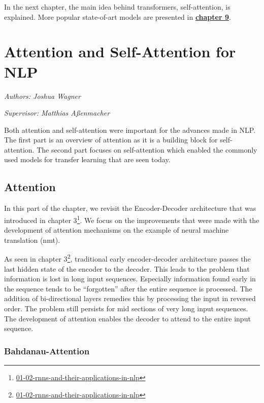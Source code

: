 \documentclass[]{krantz}
\renewcommand{\href}[2]{#2\footnote{\url{#1}}}
\begin{document}
In the next chapter, the main idea behind transformers, self-attention, is explained. More popular state-of-art models are presented in \protect\hyperlink{transfer-learning-for-nlp-ii}{\textbf{chapter 9}}.

\hypertarget{attention-and-self-attention-for-nlp}{%
\chapter{Attention and Self-Attention for NLP}\label{attention-and-self-attention-for-nlp}}

\emph{Authors: Joshua Wagner}

\emph{Supervisor: Matthias Aßenmacher}

Both attention and self-attention were important for the advances made in NLP.
The first part is an overview of attention as it is a building block for self-attention.
The second part focuses on self-attention which enabled the commonly used models
for transfer learning that are seen today.

\hypertarget{attention}{%
\section{Attention}\label{attention}}

In this part of the chapter, we revisit the Encoder-Decoder architecture that was introduced
in chapter \href{01-02-rnns-and-their-applications-in-nlp}{3}. We focus on the improvements
that were made with the development of attention mechanisms on the example of neural machine translation (nmt).

As seen in chapter \href{01-02-rnns-and-their-applications-in-nlp}{3}, traditional early
encoder-decoder architecture passes the last hidden state of the encoder to the decoder.
This leads to the problem that information is lost in long input sequences.
Especially information found early in the sequence tends to be ``forgotten'' after
the entire sequence is processed. The addition of bi-directional layers remedies
this by processing the input in reversed order. The problem still persists for mid
sections of very long input sequences. The development of attention enables the decoder to
attend to the entire input sequence.

\hypertarget{bahdanau-attention}{%
\subsection{Bahdanau-Attention}\label{bahdanau-attention}}
\end{document}
